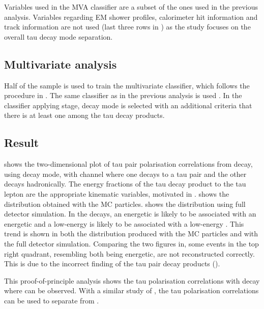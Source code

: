Variables used in  the MVA classifier are a subset of the ones used in the previous analysis. Variables regarding EM shower profiles, calorimeter hit information and track information are not used (last three rows in ) as the study focuses on the overall tau decay mode separation.



\subsection{Multivariate analysis}

Half of the sample is used to train the multivariate classifier,  which follows the procedure in  . The same classifier as in the previous analysis  is used .   In the classifier applying stage, \tauToPion decay mode is selected with an additional criteria that there is at least one \Ppipm among the tau decay products.

\subsection{Result}

 shows the two-dimensional plot of tau pair polarisation correlations from \PZ decay,  using \tauToPion decay mode, with \eeZZ channel where one \PZ decays to a tau pair and the other \PZ decays hadronically. The energy fractions of the tau decay product to the tau lepton are the appropriate kinematic variables, motivated in .  shows the distribution obtained with the MC particles.  shows the distribution using full detector simulation. In the \ZToTauTau decays, an energetic \Ppiplus is likely to be associated with an energetic \Ppiminus and a low-energy \Ppiplus is  likely to be associated with a low-energy \Ppiminus. This trend is shown in both the distribution produced with the MC particles and with the full detector simulation. Comparing the two figures in, some events in the top right quadrant, resembling both \Ppipm being energetic, are not reconstructed correctly. This is due to the incorrect finding of the tau pair decay products ().

This proof-of-principle analysis shows the tau polarisation correlations with \ZToTauTau decay where \tauToPion can be observed. With a similar study of \HiggsToTauTau,  the tau polarisation correlations can be used to separate \PHiggs from \PZ.



